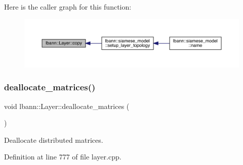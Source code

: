 Here is the caller graph for this function\+:\nopagebreak
\begin{figure}[H]
\begin{center}
\leavevmode
\includegraphics[width=350pt]{classlbann_1_1Layer_af420f22bbac801c85483ade84588a23f_icgraph}
\end{center}
\end{figure}
\mbox{\label{classlbann_1_1Layer_a888392d6ac6906093a8125c6a37de075}} 
\subsubsection{\texorpdfstring{deallocate\+\_\+matrices()}{deallocate\_matrices()}}
{\footnotesize\ttfamily void lbann\+::\+Layer\+::deallocate\+\_\+matrices (\begin{DoxyParamCaption}{ }\end{DoxyParamCaption})\hspace{0.3cm}{\ttfamily [private]}}

Deallocate distributed matrices. 

Definition at line 777 of file layer.\+cpp.


